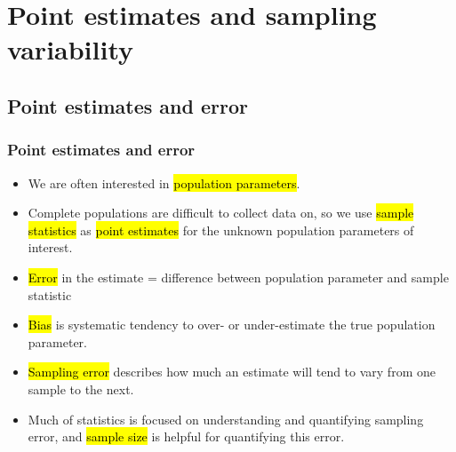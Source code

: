 
\section{Point estimates and sampling variability}


\subsection{Point estimates and error}


\begin{frame}
\frametitle{Point estimates and error}

\begin{itemize}

\item We are often interested in \hl{population parameters}.

\item Complete populations are difficult to collect data on, so we use \hl{sample statistics} as \hl{point estimates} for the unknown population parameters of interest.

\item \hl{Error} in the estimate = difference between population parameter and sample statistic

\item \hl{Bias} is systematic tendency to over- or under-estimate the true population parameter.

\item \hl{Sampling error} describes how much an estimate will tend to vary from one sample to the next.

\item Much of statistics is focused on understanding and quantifying sampling error, and \hl{sample size} is helpful for quantifying this error.

\end{itemize}

\end{frame}


\begin{frame}
\frametitle{}


\pause


\end{frame}

